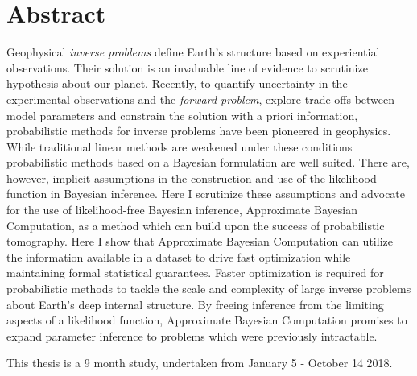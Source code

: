 \chapter{Abstract}

Geophysical \textit{inverse problems} define Earth's structure based on experiential observations. Their solution is an invaluable line of evidence to scrutinize hypothesis about our planet. Recently, to quantify uncertainty in the experimental observations and the \textit{forward problem}, explore trade-offs between model parameters and constrain the solution with a priori information, probabilistic methods for inverse problems have been pioneered in geophysics. While traditional linear methods are weakened under these conditions probabilistic methods based on a Bayesian formulation are well suited.  There are, however, implicit assumptions in the construction and use of the likelihood function in Bayesian inference. Here I scrutinize these assumptions and advocate for the use of likelihood-free Bayesian inference, Approximate Bayesian Computation, as a method which can build upon the success of probabilistic tomography. Here I show that Approximate Bayesian Computation can utilize the information available in a dataset to drive fast optimization while maintaining formal statistical guarantees. Faster optimization is required for probabilistic methods to tackle the scale and complexity of large inverse problems about Earth’s deep internal structure. By freeing inference from the limiting aspects of a likelihood function, Approximate Bayesian Computation promises to expand parameter inference to problems which were previously intractable. \par
This thesis is a 9 month study, undertaken from January 5 - October 14 2018. 
